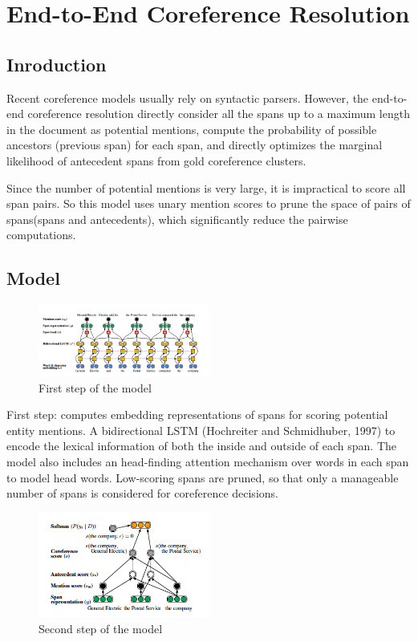 \documentclass[11pt]{article}
\begin{document}
\section{End-to-End Coreference Resolution}

\subsection{Inroduction}
Recent coreference models usually rely on syntactic parsers. However, the end-to-end coreference resolution directly consider all the spans up to a maximum length in the document as potential mentions,  compute the probability of possible ancestors (previous span) for each span, and directly optimizes the marginal likelihood of antecedent spans from gold coreference clusters.

Since the number of potential mentions is very large, it is impractical to score all span pairs. So this model uses unary mention scores to prune the space of pairs of spans(spans and antecedents), which significantly reduce the pairwise computations.

\subsection{Model}

\begin{figure}[h]
                
 \includegraphics[width=0.5\textwidth]{02.jpg}
 \caption{First step of the model}
                
\end{figure}

First step:  computes embedding representations of spans for scoring potential entity mentions.
A  bidirectional LSTM (Hochreiter and Schmidhuber, 1997) to encode the lexical information of both the inside and outside of each span. The model also includes an head-finding attention mechanism over words in each span to model head words.
Low-scoring spans are pruned, so that only a manageable number of spans is considered for coreference decisions.

\begin{figure}[h]                
 \includegraphics[width=0.5\textwidth]{03.jpg}
 \caption{Second step of the model}             
\end{figure}
\end{document}
